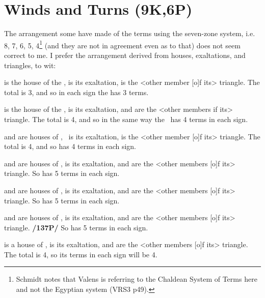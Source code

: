 \section{Winds and Turns (9K,6P)}

The arrangement some have made of the terms using the seven-zone system, i.e. 8, 7, 6, 5, 4\footnote{Schmidt notes that Valens is referring to the Chaldean System of Terms here and not the Egyptian system (VRS3 p49).} (and they are not in agreement even as to that) does not seem correct to me. I prefer the arrangement derived from houses, exaltations, and triangles, to wit:

\Leo\xspace is the house of the \Sun, \Aries\xspace is its exaltation, \Sagittarius\xspace is the <other member [o]f its> triangle. The total is 3, and so in each sign the \Sun\xspace has 3 terms.

\Cancer\xspace is the house of the \Moon, \Taurus\xspace is its exaltation, \Virgo\xspace and \Capricorn\xspace are the <other members if its> triangle. The total is 4, and so in the same way the \Moon\, has 4 terms in each sign.

\Capricorn\xspace and \Aquarius\xspace are houses of \Saturn, \Libra\, is its exaltation, \Gemini\xspace is the <other member [o]f its> triangle. The total is 4, and so \Saturn\xspace has 4 terms in each sign.

\Sagittarius\xspace and \Pisces\xspace are houses of \Jupiter, \Cancer\xspace is its exaltation, \Aries\xspace and \Leo\xspace are the <other members [o]f its> triangle. So \Jupiter\xspace has 5 terms in each sign.

\Aries\xspace and \Scorpio\xspace are houses of \Mars, \Capricorn\xspace is its exaltation, \Pisces\xspace and \Cancer\xspace are the <other members [o]f its> triangle. So \Mars\xspace has 5 terms in each sign.

\Taurus\xspace and \Libra\xspace are houses of \Venus, \Pisces\xspace is its exaltation, \Virgo\xspace and \Capricorn\xspace are the <other members [o]f its> triangle. \textbf{/137P/} So \Venus\xspace has 5 terms in each sign.

\Gemini\xspace is a house of \Mercury, \Virgo\xspace is its exaltation, \Aquarius\xspace and \Libra\xspace are the <other members [o]f its> triangle. The total is 4, so its terms in each sign will be 4.
\newpage

